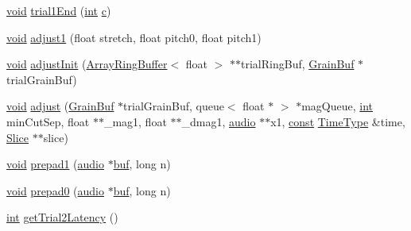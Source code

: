\begin{DoxyCompactItemize}
\item 
\hyperlink{sound_8c_ae35f5844602719cf66324f4de2a658b3}{void} \hyperlink{class__sbsms___1_1_s_m_s_a64ce1c02700fb29387c86a0679bf1202}{trial1\+End} (\hyperlink{xmltok_8h_a5a0d4a5641ce434f1d23533f2b2e6653}{int} \hyperlink{rfft2d_test_m_l_8m_ae0323a9039add2978bf5b49550572c7c}{c})
\item 
\hyperlink{sound_8c_ae35f5844602719cf66324f4de2a658b3}{void} \hyperlink{class__sbsms___1_1_s_m_s_a7a90a7d99f53876fd1d8187a3e6c4984}{adjust1} (float stretch, float pitch0, float pitch1)
\item 
\hyperlink{sound_8c_ae35f5844602719cf66324f4de2a658b3}{void} \hyperlink{class__sbsms___1_1_s_m_s_a03044a38e326e5ea885238a969211366}{adjust\+Init} (\hyperlink{class__sbsms___1_1_array_ring_buffer}{Array\+Ring\+Buffer}$<$ float $>$ $\ast$$\ast$trial\+Ring\+Buf, \hyperlink{class__sbsms___1_1_grain_buf}{Grain\+Buf} $\ast$trial\+Grain\+Buf)
\item 
\hyperlink{sound_8c_ae35f5844602719cf66324f4de2a658b3}{void} \hyperlink{class__sbsms___1_1_s_m_s_ad613526ebf8f4072893f233a0082a49e}{adjust} (\hyperlink{class__sbsms___1_1_grain_buf}{Grain\+Buf} $\ast$trial\+Grain\+Buf, queue$<$ float $\ast$ $>$ $\ast$mag\+Queue, \hyperlink{xmltok_8h_a5a0d4a5641ce434f1d23533f2b2e6653}{int} min\+Cut\+Sep, float $\ast$$\ast$\+\_\+mag1, float $\ast$$\ast$\+\_\+dmag1, \hyperlink{namespace__sbsms___a11786cc5bd221ff534972ae350477324}{audio} $\ast$$\ast$x1, \hyperlink{getopt1_8c_a2c212835823e3c54a8ab6d95c652660e}{const} \hyperlink{namespace__sbsms___a3a161c3deff71e932c0ec86aad54eb7c}{Time\+Type} \&time, \hyperlink{class__sbsms___1_1_slice}{Slice} $\ast$$\ast$slice)
\item 
\hyperlink{sound_8c_ae35f5844602719cf66324f4de2a658b3}{void} \hyperlink{class__sbsms___1_1_s_m_s_a2b68ec1d63e5639108d0325dd69031a5}{prepad1} (\hyperlink{namespace__sbsms___a11786cc5bd221ff534972ae350477324}{audio} $\ast$\hyperlink{xlstr_8c_a781718f5b53a876fe91c424c4607fa8f}{buf}, long n)
\item 
\hyperlink{sound_8c_ae35f5844602719cf66324f4de2a658b3}{void} \hyperlink{class__sbsms___1_1_s_m_s_a3c5349eb10315896f09e813bb8d6e70b}{prepad0} (\hyperlink{namespace__sbsms___a11786cc5bd221ff534972ae350477324}{audio} $\ast$\hyperlink{xlstr_8c_a781718f5b53a876fe91c424c4607fa8f}{buf}, long n)
\item 
\hyperlink{xmltok_8h_a5a0d4a5641ce434f1d23533f2b2e6653}{int} \hyperlink{class__sbsms___1_1_s_m_s_a62e37698ecae7d6719913cf220014bbd}{get\+Trial2\+Latency} ()
\end{DoxyCompactItemize}
